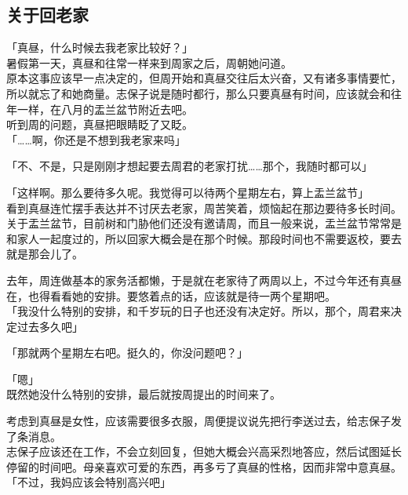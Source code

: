 \subsection{关于回老家}

「真昼，什么时候去我老家比较好？」\\

暑假第一天，真昼和往常一样来到周家之后，周朝她问道。\\

原本这事应该早一点决定的，但周开始和真昼交往后太兴奋，又有诸多事情要忙，所以就忘了和她商量。志保子说是随时都行，那么只要真昼有时间，应该就会和往年一样，在八月的盂兰盆节附近去吧。\\

听到周的问题，真昼把眼睛眨了又眨。\\

「……啊，你还是不想到我老家来吗」

「不、不是，只是刚刚才想起要去周君的老家打扰……那个，我随时都可以」

「这样啊。那么要待多久呢。我觉得可以待两个星期左右，算上盂兰盆节」\\

看到真昼连忙摆手表达并不讨厌去老家，周苦笑着，烦恼起在那边要待多长时间。\\

关于盂兰盆节，目前树和门胁他们还没有邀请周，而且一般来说，盂兰盆节常常是和家人一起度过的，所以回家大概会是在那个时候。那段时间也不需要返校，要去就是那会儿了。

去年，周连做基本的家务活都懒，于是就在老家待了两周以上，不过今年还有真昼在，也得看看她的安排。要悠着点的话，应该就是待一两个星期吧。\\

「我没什么特别的安排，和千岁玩的日子也还没有决定好。所以，那个，周君来决定过去多久吧」

「那就两个星期左右吧。挺久的，你没问题吧？」

「嗯」\\

既然她没什么特别的安排，最后就按周提出的时间来了。

考虑到真昼是女性，应该需要很多衣服，周便提议说先把行李送过去，给志保子发了条消息。\\

志保子应该还在工作，不会立刻回复，但她大概会兴高采烈地答应，然后试图延长停留的时间吧。母亲喜欢可爱的东西，再多亏了真昼的性格，因而非常中意真昼。\\

「不过，我妈应该会特别高兴吧」

